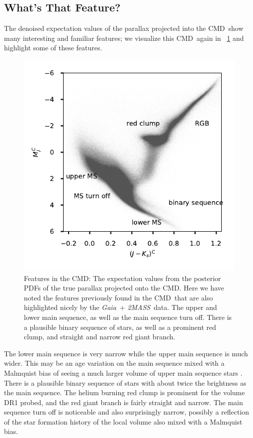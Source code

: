 \documentclass[modern]{aastex61}
\newcommand{\acronym}[1]{{\small{#1}}}
\newcommand{\project}[1]{\textsl{#1}}
\newcommand{\tmass}{\project{\acronym{2MASS}}}
\newcommand{\gaia}{\project{Gaia}}
\newcommand{\cmd}{\acronym{CMD}}
\begin{document}
\subsection{What's That Feature?}
The denoised expectation values of the parallax projected into the \cmd\ show many interesting and familiar features; we visualize this \cmd\ again in \figurename~\ref{fig:wtf} and highlight some of these features.
\begin{figure}
\centering
  \includegraphics[width=\textwidth]{whatsThatFeature.pdf}
\caption{Features in the \cmd: The expectation values from the posterior PDFs of the true parallax projected onto the \cmd.
Here we have noted the features previously found in the \cmd\ that are also highlighted nicely by the \gaia\ + \tmass\ data.
The upper and lower main sequence, as well as the main sequence turn off.
There is a plausible binary sequence of stars, as well as a prominent red clump, and straight and narrow red giant branch. }
\label{fig:wtf}
\end{figure}

The lower main sequence is very narrow while the upper main sequence
is much wider. This may be an age variation on the main sequence mixed
with a Malmquist bias of seeing a much larger volume of upper main
sequence stars \citep{malmquist22}. There is a plausible binary sequence of stars with
about twice the brightness as the main sequence. The helium burning
red clump is prominent for the volume DR1 probed, and the red giant
branch is fairly straight and narrow. The main sequence turn off is
noticeable and also surprisingly narrow, possibly a reflection of the
star formation history of the local volume also mixed with a Malmquist
bias.
\end{document}
